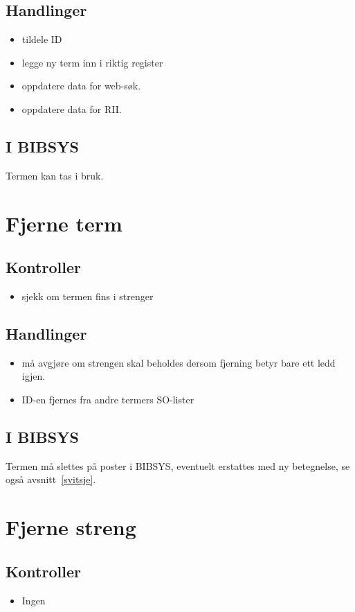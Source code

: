 \documentclass[a4paper,10pt,norsk]{article}
\begin{document}
\subsection*{Handlinger}
\begin{itemize}
\item tildele ID
\item legge ny term inn i riktig register
\item oppdatere data for web-søk.
\item oppdatere data for RII.
\end{itemize}
\subsection*{I BIBSYS}
Termen kan tas i bruk.

\section{Fjerne term}\label{fjerneterm}
\subsection*{Kontroller}
\begin{itemize}
\item sjekk om termen fins i strenger
\end{itemize}
\subsection*{Handlinger}
\begin{itemize}
\item må avgjøre om strengen skal beholdes dersom fjerning betyr bare ett ledd igjen.
\item ID-en fjernes fra andre termers SO-lister
\end{itemize}
\subsection*{I BIBSYS}
Termen må slettes på poster i BIBSYS, eventuelt erstattes med ny betegnelse, se også avsnitt~\ref{svitsje}.

\section{Fjerne streng}\label{fjernestreng}
\subsection*{Kontroller}
\begin{itemize}
\item Ingen
\end{itemize}
\end{document}
